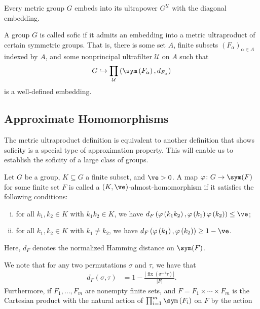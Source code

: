 \documentclass[10pt]{mypackage}
\begin{document}
Every metric group $G$ embeds into its ultrapower $ G^{\mathcal{U}} $ with the diagonal embedding.
\begin{definition}
  A group $G$ is called sofic if it admits an embedding into a metric ultraproduct of certain symmetric groups. That is, there is some set $A$, finite subsets $\left( F_{\alpha} \right)_{\alpha\in A}$ indexed by $A$, and some nonprincipal ultrafilter $ \mathcal{U} $ on $A$ such that
  \begin{align*}
    G\hookrightarrow \prod_{\mathcal{U}} \left( \sym\left( F_{\alpha} \right),d_{F_{\alpha}} \right)
  \end{align*}
  is a well-defined embedding.
\end{definition}
\subsection{Approximate Homomorphisms}%
The metric ultraproduct definition is equivalent to another definition that shows soficity is a special type of approximation property. This will enable us to establish the soficity of a large class of groups.
\begin{definition}
  Let $G$ be a group, $K\subseteq G$ a finite subset, and $\ve > 0$. A map $\varphi\colon G\rightarrow \sym(F)$ for some finite set $F$ is called a $\left( K,\ve \right)$-almost-homomorphism if it satisfies the following conditions:
  \begin{enumerate}[(i)]
    \item for all $k_1,k_2\in K$ with $k_1k_2\in K$, we have $d_F\left( \varphi\left( k_1k_2 \right),\varphi\left( k_1 \right)\varphi\left( k_2 \right) \right) \leq \ve$;
    \item for all $k_1,k_2\in K$ with $k_1\neq k_2$, we have $d_F\left( \varphi\left( k_1 \right),\varphi\left( k_2 \right) \right) \geq 1-\ve$.
  \end{enumerate}
  Here, $d_F$ denotes the normalized Hamming distance on $\sym(F)$.
\end{definition}
We note that for any two permutations $\sigma$ and $\tau$, we have that
\begin{align*}
  d_F\left( \sigma,\tau \right) &= 1-\frac{\left\vert \operatorname{fix}\left( \sigma^{-1}\tau \right) \right\vert}{\left\vert F \right\vert}.
\end{align*}
Furthermore, if $F_1,\dots,F_m$ are nonempty finite sets, and $F = F_1\times\cdots\times F_m$ is the Cartesian product with the natural action of $\prod_{i=1}^{m}\sym\left( F_i \right)$ on $F$ by the action 
\end{document}
